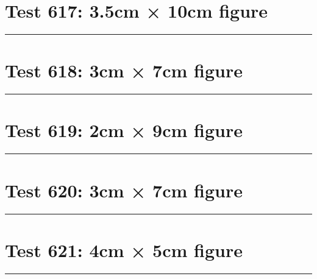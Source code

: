 \documentclass[a4paper,11pt]{article}
\begin{document}
\section*{Test 617: 3.5cm × 10cm figure}
\begin{swarmwrap}%
  \begin{minipage}[t]{3cm}
    \centering
    \rule{\linewidth}{10cm}
  \end{minipage}%
\end{swarmwrap}%
\swarmwrapnext
\lipsum[80]
\lipsum[81]
\lipsum[82]
\lipsum[83]
\lipsum[84]
\section*{Test 618: 3cm × 7cm figure}
\begin{swarmwrap}%
  \begin{minipage}[t]{3cm}
    \centering
    \rule{\linewidth}{7cm}
  \end{minipage}%
\end{swarmwrap}%
\swarmwrapnext
\lipsum[121]
\lipsum[122]
\lipsum[123]
\lipsum[124]
\lipsum[125]
\lipsum[126]
\section*{Test 619: 2cm × 9cm figure}
\begin{swarmwrap}%
  \begin{minipage}[t]{2cm}
    \centering
    \rule{\linewidth}{9cm}
  \end{minipage}%
\end{swarmwrap}%
\swarmwrapnext
\lipsum[54]
\lipsum[55]
\lipsum[56]
\lipsum[57]
\lipsum[58]
\section*{Test 620: 3cm × 7cm figure}
\begin{swarmwrap}%
  \begin{minipage}[t]{3cm}
    \centering
    \rule{\linewidth}{7cm}
  \end{minipage}%
\end{swarmwrap}%
\swarmwrapnext
\lipsum[13]
\lipsum[14]
\lipsum[15]
\lipsum[16]
\lipsum[17]
\lipsum[18]
\section*{Test 621: 4cm × 5cm figure}
\begin{swarmwrap}%
  \begin{minipage}[t]{4cm}
    \centering
    \rule{\linewidth}{5cm}
  \end{minipage}%
\end{swarmwrap}%
\swarmwrapnext
\lipsum[6]
\lipsum[7]
\lipsum[8]
\lipsum[9]
\end{document}
